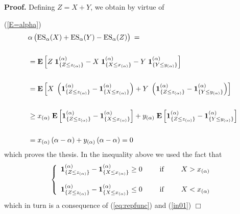 \documentclass[11pt,a4paper,leqno]{article}
\begin{document}
\textbf{Proof.} Defining $Z = X+Y$, we obtain by virtue of {(\ref{E=alpha})
\begin{align}
& \alpha\,%
\bigl( \mathrm{ES}_\alpha(X) + \mathrm{ES}_\alpha(Y)-\mathrm{ES}_\alpha(Z)\bigr) \: = \\\nonumber \\
&= 
{\bf E}\left[
Z\; \mathbf{1}_{\{Z \le z_{(\alpha)}\}}^{(\alpha)} - X\; \mathbf{1}_{\{X \le x_{(\alpha)}\}}^{(\alpha)} -Y\; \mathbf{1}_{\{Y \le y_{(\alpha)}\}}^{(\alpha)}
\right] \nonumber\\\nonumber\\
 & =  
{\bf E}\left[
X\;\left(  \mathbf{1}_{\{Z \le z_{(\alpha)}\}}^{(\alpha)} -  \mathbf{1}_{\{X \le x_{(\alpha)}\}}^{(\alpha)} \right)
+
Y\;\left(  \mathbf{1}_{\{Z \le z_{(\alpha)}\}}^{(\alpha)} -  \mathbf{1}_{\{Y \le y_{(\alpha)}\}}^{(\alpha)} \right)
\right] \nonumber\\\nonumber\\
&\geq  
x_{(\alpha)} \; {\bf E}\left[
 \mathbf{1}_{\{Z \le z_{(\alpha)}\}}^{(\alpha)} -  \mathbf{1}_{\{X \le x_{(\alpha)}\}}^{(\alpha)} \right]
+
y_{(\alpha)} \; {\bf E}\left[
 \mathbf{1}_{\{Z \le z_{(\alpha)}\}}^{(\alpha)} -  \mathbf{1}_{\{Y \le y_{(\alpha)}\}}^{(\alpha)} \right]
\nonumber\\\nonumber\\
& = x_{(\alpha)} \, (\alpha-\alpha) + y_{(\alpha)}\, (\alpha-\alpha) =0
\nonumber
\end{align}
which proves the thesis. In the inequality above we used the fact that
\begin{equation}
\left\{
\begin{array}{lll}
\displaystyle \mathbf{1}_{\{Z \le z_{(\alpha)}\}}^{(\alpha)} -  \mathbf{1}_{\{X \le x_{(\alpha)}\}}^{(\alpha)} \geq 0 & \hspace{5mm}\mbox{if} \hspace{5mm} & X>x_{(\alpha)} \\\\
\displaystyle \mathbf{1}_{\{Z \le z_{(\alpha)}\}}^{(\alpha)} -  \mathbf{1}_{\{X \le x_{(\alpha)}\}}^{(\alpha)} \leq 0 & \hspace{5mm}\mbox{if} \hspace{5mm} & X<x_{(\alpha)}
\end{array}
\right.
\end{equation}
which in turn is a consequence of (\ref{eq:repfunc}) and
(\ref{in01})
\hfill $\Box$

\newpage

}
\end{document}
